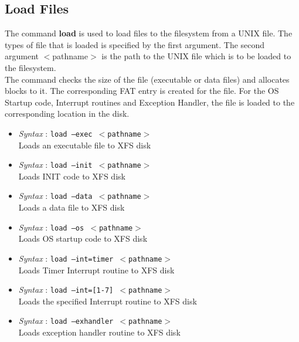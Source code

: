 \documentclass[11pt]{report}
\begin{document}
\subsection{Load Files}
The command \textbf{load} is used to load files to the filesystem from a UNIX file. The types of file that is loaded is specified by the first argument. The second argument $<$pathname$>$ is the path to the UNIX file which is to be loaded to the filesystem. \\
The command checks the size of the file (executable or data files) and allocates blocks to it. The corresponding FAT entry is created for the file. For the OS Startup code, Interrupt routines and Exception Handler, the file is loaded to the corresponding location in the disk.
\begin{itemize}
	\item \textit{Syntax} : \texttt{load --exec  $<$pathname$>$}  \\
	 Loads an executable file to XFS disk 
	\item \textit{Syntax} : \texttt{load --init  $<$pathname$>$}  \\
	 Loads INIT code to XFS disk 
	\item \textit{Syntax} : \texttt{load --data $<$pathname$>$} \\
	 Loads a data file to XFS disk 
	\item \textit{Syntax} : \texttt{load --os  $<$pathname$>$} \\
	 Loads OS startup code to XFS disk 
	\item \textit{Syntax} : \texttt{load --int=timer $<$pathname$>$}\\
	 Loads Timer Interrupt routine to XFS disk 
	\item \textit{Syntax} : \texttt{load --int=[1-7] $<$pathname$>$}\\
	 Loads the specified Interrupt routine to XFS disk 
	\item \textit{Syntax} : \texttt{load --exhandler $<$pathname$>$}  \\
	 Loads exception handler routine to XFS disk 
	 
\end{itemize}
\end{document}
